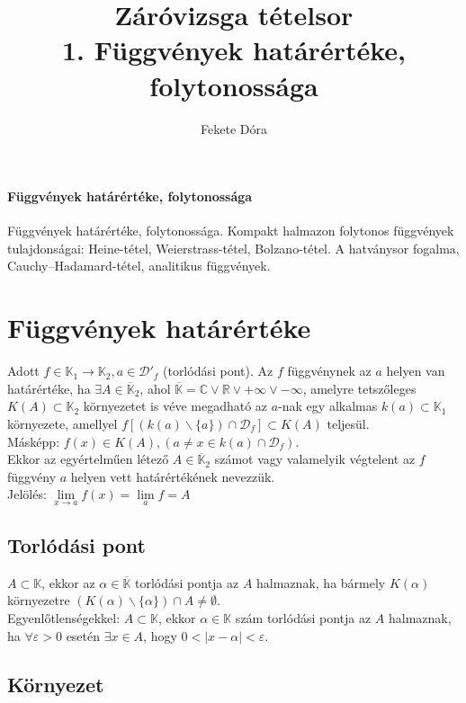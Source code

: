 \documentclass[margin=0px]{article}
\title{Záróvizsga tételsor \\ \large 1. Függvények határértéke, folytonossága}
\date{}
\author{Fekete Dóra}
\newenvironment{tetel}[1]{\paragraph{#1 \\}}{}
\begin{document}
	\maketitle
	
	\begin{tetel}{Függvények határértéke, folytonossága}
			Függvények határértéke, folytonossága. Kompakt halmazon folytonos függvények tulajdonságai: Heine-tétel, Weierstrass-tétel, Bolzano-tétel. A hatványsor fogalma, Cauchy--Hadamard-tétel, analitikus függvények.
	\end{tetel}
	
	\section{Függvények határértéke}
	
	Adott $f \in \mathbb{K}_{1} \to \mathbb{K}_{2}, a \in \mathcal{D}'_{f}$ (torlódási pont). Az $f$ függvénynek az $a$ helyen van határértéke, ha $\exists A \in \overline{\mathbb{K}}_{2}$, ahol $\overline{\mathbb{K}} = \mathbb{C} \vee \mathbb{R} \vee +\infty \vee -\infty$, amelyre tetszőleges $K(A) \subset \mathbb{K}_{2}$ környezetet is véve megadható az $a$-nak egy alkalmas $k(a) \subset \mathbb{K}_{1}$ környezete, amellyel $f[(k(a) \backslash \{a\}) \cap \mathcal{D}_{f}] \subset K(A)$ teljesül. \\
	Másképp: $f(x) \in K(A), (a \neq x \in k(a) \cap \mathcal{D}_{f})$. \\
	Ekkor az egyértelműen létező $A \in \overline{\mathbb{K}}_{2}$ számot vagy valamelyik végtelent az $f$ függvény $a$ helyen vett határértékének nevezzük. \\
	Jelölés: $\lim\limits_{x \to a}{f(x)} = \lim\limits_{a}{f} = A$
	
	\subsection{Torlódási pont}
	
	$A \subset \mathbb{K}$, ekkor az $\alpha \in \overline{\mathbb{K}}$ torlódási pontja az $A$ halmaznak, ha bármely $K(\alpha)$ környezetre $(K(\alpha) \backslash \{\alpha\}) \cap A \neq \emptyset$. \\
	Egyenlőtlenségekkel: $A \subset \mathbb{K}$, ekkor $\alpha \in \mathbb{K}$ szám torlódási pontja az $A$ halmaznak, ha $\forall \varepsilon > 0$ esetén $\exists x \in A$, hogy $0 < |x-\alpha| < \varepsilon$.
	
	\subsection{Környezet}
	
\end{document}
